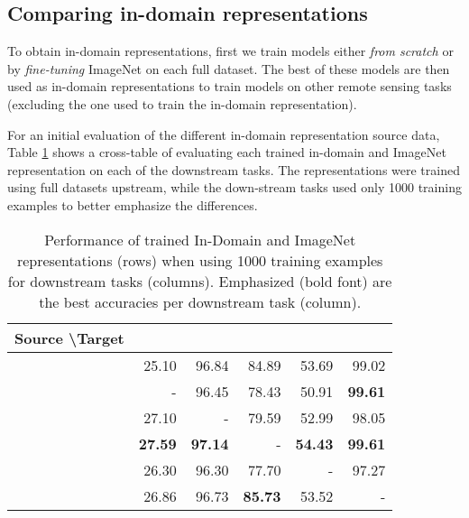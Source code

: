 \subsection{Comparing in-domain representations}
\label{training-in-domain-repr}
To obtain in-domain representations, first we train models either \emph{from scratch} or by \emph{fine-tuning} ImageNet on each full dataset. The best of these models are then used as in-domain representations to train models on other remote sensing tasks (excluding the one used to train the in-domain representation).

For an initial evaluation of the different in-domain representation source data, Table \cref{tab:cross-in-domain} shows a cross-table of evaluating each trained in-domain and ImageNet representation on each of the downstream tasks. The representations were trained using full datasets upstream, while the down-stream tasks used only 1000 training examples to better emphasize the differences.














\begin{table}[tb]
    \caption{Performance of trained In-Domain and ImageNet representations (rows) when using 1000 training examples for downstream tasks (columns). Emphasized (bold font) are the best accuracies per downstream task (column).}
    \label{tab:cross-in-domain}
    \centering

\begin{tabular}{lrrrrr}
\toprule
Source \textbackslash Target & \bigearthnet{} &    \eurosat{} &   \resisc{} &     \sosat{} &  \ucmerced{} \\
\midrule
\imagenet{}    &       25.10 &      96.84 &      84.89 &      53.69 &      99.02 \\
\bigearthnet{} &           - &      96.45 &      78.43 &      50.91 &  \bf 99.61 \\
\eurosat{}     &       27.10 &          - &      79.59 &      52.99 &      98.05 \\
\resisc{}    &   \bf 27.59 &  \bf 97.14 &          - &  \bf 54.43 &  \bf 99.61 \\
\sosat{}      &       26.30 &      96.30 &      77.70 &          - &      97.27 \\
\ucmerced{}   &       26.86 &      96.73 &  \bf 85.73 &      53.52 &          - \\
\bottomrule
\end{tabular}


\end{table}

